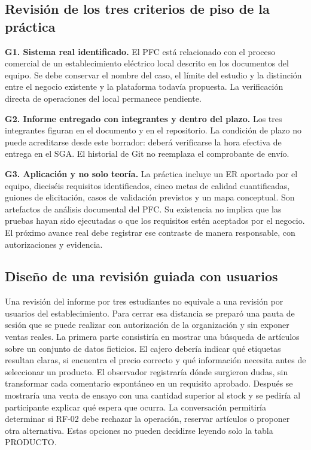 \subsection{Revisión de los tres criterios de piso de la práctica}
\textbf{G1. Sistema real identificado.} El PFC está relacionado con el proceso comercial de un establecimiento eléctrico local descrito en los documentos del equipo. Se debe conservar el nombre del caso, el límite del estudio y la distinción entre el negocio existente y la plataforma todavía propuesta. La verificación directa de operaciones del local permanece pendiente.

\textbf{G2. Informe entregado con integrantes y dentro del plazo.} Los tres integrantes figuran en el documento y en el repositorio. La condición de plazo no puede acreditarse desde este borrador: deberá verificarse la hora efectiva de entrega en el SGA. El historial de Git no reemplaza el comprobante de envío.

\textbf{G3. Aplicación y no solo teoría.} La práctica incluye un ER aportado por el equipo, dieciséis requisitos identificados, cinco metas de calidad cuantificadas, guiones de elicitación, casos de validación previstos y un mapa conceptual. Son artefactos de análisis documental del PFC. Su existencia no implica que las pruebas hayan sido ejecutadas o que los requisitos estén aceptados por el negocio. El próximo avance real debe registrar ese contraste de manera responsable, con autorizaciones y evidencia.


\subsection{Diseño de una revisión guiada con usuarios}
Una revisión del informe por tres estudiantes no equivale a una revisión por usuarios del establecimiento. Para cerrar esa distancia se preparó una pauta de sesión que se puede realizar con autorización de la organización y sin exponer ventas reales. La primera parte consistiría en mostrar una búsqueda de artículos sobre un conjunto de datos ficticios. El cajero debería indicar qué etiquetas resultan claras, si encuentra el precio correcto y qué información necesita antes de seleccionar un producto. El observador registraría dónde surgieron dudas, sin transformar cada comentario espontáneo en un requisito aprobado. Después se mostraría una venta de ensayo con una cantidad superior al stock y se pediría al participante explicar qué espera que ocurra. La conversación permitiría determinar si RF-02 debe rechazar la operación, reservar artículos o proponer otra alternativa. Estas opciones no pueden decidirse leyendo solo la tabla PRODUCTO.

